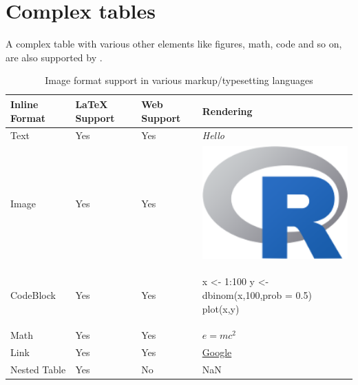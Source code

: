 \section{Complex tables}
A complex table with various other elements like figures, math, code and so on, are also supported
by .  
\begin{table}[htbp]
\centering
\begin{tabular}{|l | lll |}
 \hline
 Inline Format & LaTeX Support & Web Support &  Rendering \\
 \hline
 Text       & Yes & Yes  & \emph{Hello} \\ \hline
 Image       & Yes & Yes & \begin{minipage}{0.25\textwidth}
    \centering
    \includegraphics[width=1\textwidth]{Rlogo-5.png}
    \end{minipage} \\ \hline
 CodeBlock      & Yes & Yes & \begin{minipage}{0.45\textwidth}
\vspace{1mm}
\begin{example}
x <- 1:100
y <- dbinom(x,100,prob = 0.5)
plot(x,y)
\end{example}
    \end{minipage} \\ \hline
 Math      & Yes & Yes & $e = m c^2 $ \\ \hline
 Link      & Yes & Yes &  \href{www.google.com}{Google} \\ \hline
 Nested Table & Yes & No & NaN \\
\hline
\end{tabular}
\caption{Image format support in various markup/typesetting languages}
\label{table:3}
\end{table}

